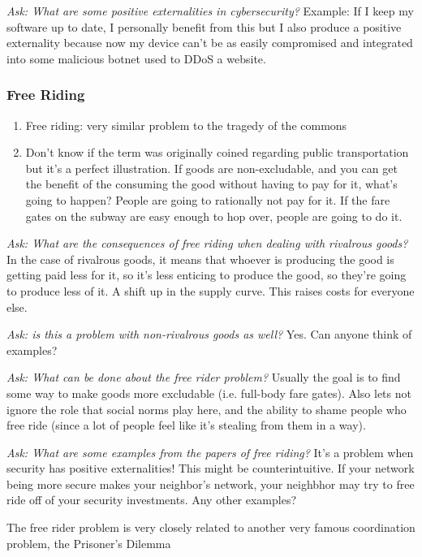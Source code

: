 \documentclass[11pt]{article}
\begin{document}
{\it Ask: What are some positive externalities in cybersecurity?} Example: If I keep my software up to date, I personally benefit from this but I also produce a positive externality because now my device can't be as easily compromised and integrated into some malicious botnet used to DDoS a website. 

\subsubsection{Free Riding}

\begin{enumerate}
    \item Free riding: very similar problem to the tragedy of the commons
    \item Don't know if the term was originally coined regarding public transportation but it's a perfect illustration. If goods are non-excludable, and you can get the benefit of the consuming the good without having to pay for it, what's going to happen? People are going to rationally not pay for it. If the fare gates on the subway are easy enough to hop over, people are going to do it.
\end{enumerate}

{\it Ask: What are the consequences of free riding when dealing with rivalrous goods?} In the case of rivalrous goods, it means that whoever is producing the good is getting paid less for it, so it's less enticing to produce the good, so they're going to produce less of it. A shift up in the supply curve. This raises costs for everyone else. 

{\it Ask: is this a problem with non-rivalrous goods as well?} Yes. Can anyone think of examples? 

{\it Ask: What can be done about the free rider problem?} Usually the goal is to find some way to make goods more excludable (i.e. full-body fare gates). Also lets not ignore the role that social norms play here, and the ability to shame people who free ride (since a lot of people feel like it's stealing from them in a way).

{\it Ask: What are some examples from the papers of free riding?} It's a problem when security has positive externalities! This might be counterintuitive. If your network being more secure makes your neighbor's network, your neighbhor may try to free ride off of your security investments. Any other examples?

The free rider problem is very closely related to another very famous coordination problem, the Prisoner's Dilemma
\end{document}
